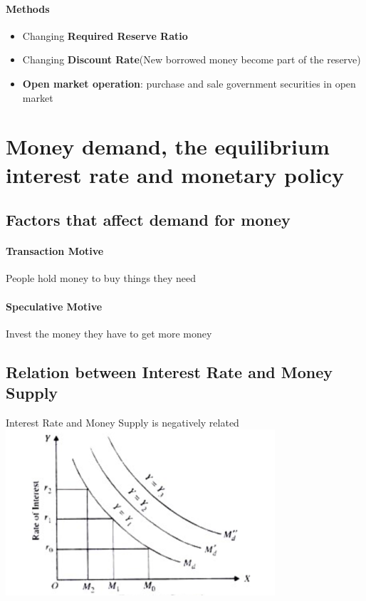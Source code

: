 \documentclass[11pt]{article}
\begin{document}
\paragraph{Methods}
\begin{itemize}
    \item Changing \textbf{Required Reserve Ratio}
    \item Changing \textbf{Discount Rate}(New borrowed money become part of the reserve)
    \item \textbf{Open market operation}: purchase and sale government securities in open market
\end{itemize}

\section{Money demand, the equilibrium interest rate and monetary policy}
\subsection{Factors that affect demand for money}
\paragraph{Transaction Motive}
People hold money to buy things they need
\paragraph{Speculative Motive}
Invest the money they have to get more money
\subsection{Relation between Interest Rate and Money Supply}
Interest Rate and Money Supply is negatively related\\
\includegraphics[width=10cm]{interest_rate.png}
\end{document}
